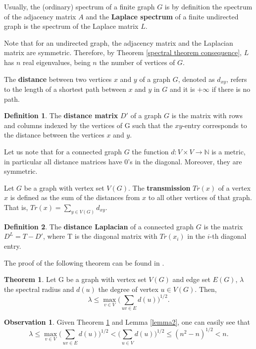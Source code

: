 \documentclass[11pt]{article}
\theoremstyle{definition}
\newtheorem{defn}{Definition}
\newtheorem{thm}{Theorem}
\newtheorem*{obs}{Observation}
\begin{document}
Usually, the (ordinary) spectrum of a finite graph $G$ is by definition the spectrum of the adjacency matrix $A$ and the \textbf{Laplace spectrum} of a finite undirected graph is the spectrum of the Laplace matrix $L$.  

Note that for an undirected graph, the adjacency matrix and the Laplacian matrix are symmetric. Therefore, by Theorem \ref{spectral theorem consequence}, $L$ has $n$ real eigenvalues, being $n$ the number of vertices of $G$. 

The \textbf{distance} between two vertices $x$ and $y$ of a graph $G$, denoted as $d_{xy}$, refers to the length of a shortest path between $x$ and $y$ in $G$ and it is $+\infty$ if there is no path.  
\begin{defn}
The \textbf{distance matrix} $D'$ of a graph $G$ is the matrix with rows and columns indexed by the vertices of G such that the $xy$-entry corresponds to the distance between the vertices $x$ and $y$. 
\end{defn}

Let us note that for a connected graph $G$ the function $d:V\times V\to \mathbb{N}$ is a metric, in particular
all distance matrices have $0$'s in the diagonal. Moreover, they are symmetric.

Let $G$ be a graph with vertex set $V(G)$. The \textbf{transmission} $Tr(x)$ of a vertex $x$ is defined as the sum of the distances from $x$ to all other vertices of that graph. That is, $Tr(x) = \sum_{y \in V(G)} d_{xy}$. 

\begin{defn}
The \textbf{distance Laplacian} of a connected graph $G$ is the matrix $D^L = T - D'$, where T is the diagonal matrix with $Tr(x_i)$ in the $i$-th diagonal entry.
\end{defn}

The proof of the following theorem can be found in \cite{shi}.

\begin{thm} \label{spectral radius}
Let G be a graph with vertex set $V(G)$ and edge set $E(G)$, $\lambda$ the spectral radius and $d(u)$ the degree of vertex $u \in V(G)$. Then, 
\begin{equation*}
    \lambda \leq \max_{v \in V}{\big(\sum_{uv \in E} d(u)\big)^{1/2}}.
\end{equation*}
\end{thm}

\begin{obs}
Given Theorem \ref{spectral radius} and Lemma \ref{lemma2}, one can easily see that
\begin{equation} \label{eq2}
    \lambda \leq \max_{v \in V}{\big(\sum_{uv \in E} d(u)\big)^{1/2}} <  \big(\sum_{u \in V} d(u) \big)^{1/2} \leq (n^2 - n)^{1/2} < n.
\end{equation}
\end{obs}
\end{document}
